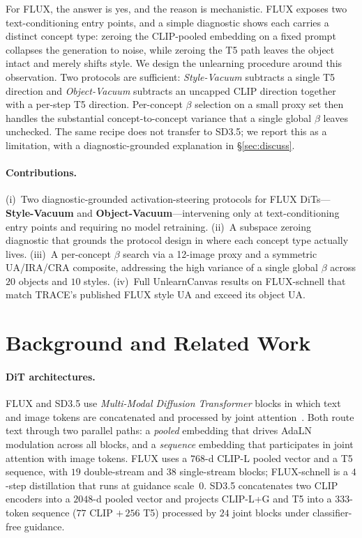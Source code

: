 \documentclass{article}
\begin{document}
For FLUX, the answer is yes, and the reason is mechanistic. FLUX
exposes two text-conditioning entry points, and a simple diagnostic
shows each carries a distinct concept type: zeroing the CLIP-pooled
embedding on a fixed prompt collapses the generation to noise, while
zeroing the T5 path leaves the object intact and merely shifts style.
We design the unlearning procedure around this observation. Two
protocols are sufficient: \emph{Style-Vacuum} subtracts a single
T5 direction and \emph{Object-Vacuum} subtracts an uncapped CLIP
direction together with a per-step T5 direction. Per-concept $\beta$
selection on a small proxy set then handles the substantial
concept-to-concept variance that a single global $\beta$ leaves
unchecked. The same recipe does not transfer to SD3.5; we report this
as a limitation, with a diagnostic-grounded explanation in
\S\ref{sec:discuss}.

\paragraph{Contributions.}
(i)~Two diagnostic-grounded activation-steering protocols for FLUX
DiTs---\textbf{Style-Vacuum} and \textbf{Object-Vacuum}---intervening
only at text-conditioning entry points and requiring no model
retraining.
(ii)~A subspace zeroing diagnostic that grounds the protocol design
in where each concept type actually lives.
(iii)~A per-concept $\beta$ search via a 12-image proxy and a
symmetric UA/IRA/CRA composite, addressing the high variance of a
single global $\beta$ across $20$ objects and $10$ styles.
(iv)~Full UnlearnCanvas results on FLUX-schnell that match TRACE's
published FLUX style UA and exceed its object UA.

\section{Background and Related Work}
\label{sec:bg}

\paragraph{DiT architectures.}
FLUX and SD3.5 use \emph{Multi-Modal Diffusion Transformer} blocks in
which text and image tokens are concatenated and processed by joint
attention~\cite{esser2024scaling}. Both route text through two
parallel paths: a \emph{pooled} embedding that drives AdaLN
modulation across all blocks, and a \emph{sequence} embedding that
participates in joint attention with image tokens. FLUX uses a
$768$-d CLIP-L pooled vector and a T5 sequence, with $19$
double-stream and $38$ single-stream blocks; FLUX-schnell is a
$4$-step distillation that runs at guidance scale~$0$. SD3.5
concatenates two CLIP encoders into a $2048$-d pooled vector and
projects CLIP-L+G and T5 into a $333$-token sequence
($77$ CLIP $+\,256$ T5) processed by $24$ joint blocks under
classifier-free guidance.
\end{document}
